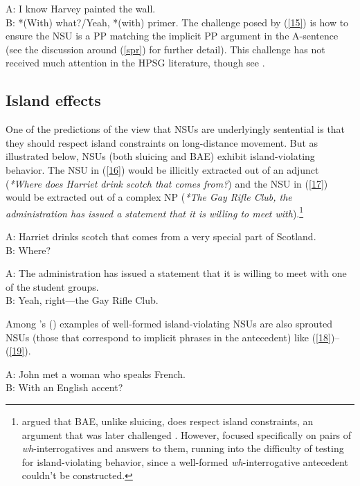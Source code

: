 {\ea A: I know Harvey painted the wall.\\B: *(With) what?/Yeah, *(with) primer.\label{15}\z
%
The challenge posed by (\ref{15}) is how to ensure
the NSU is a PP matching the implicit PP argument in 
the A-sentence (see the discussion
around (\ref{spr}) for further detail). This challenge has not received much attention in the HPSG literature, though see \citet{Kim2015}.



\subsection{Island effects}
\label{sec-island-effects}

One of the predictions of the view that NSUs are underlyingly sentential is that they should respect island constraints on long-distance movement. But as illustrated below, NSUs (both sluicing and BAE) exhibit island-violating behavior. The NSU  in (\ref{16}) would be illicitly extracted out of an adjunct (\textit{*Where does Harriet drink scotch that comes from?}) and the NSU  in (\ref{17}) would be extracted out of a complex NP (\textit{*The Gay Rifle Club, the administration has issued a statement that it is willing to meet with}).\footnote{\citet{Merchant2005a} argued that BAE, unlike sluicing, does respect island constraints, an argument that was later challenged \citep[see e.g,][]{CJ2005a, Griffiths2014}. However, \citet{Merchant2005-proc} focused specifically on pairs of \emph{wh}-interrogatives and answers to them, running into the difficulty of testing for island-violating behavior, since a well-formed \emph{wh}-interrogative antecedent couldn't be constructed.}

\ea A: Harriet drinks scotch that comes from a very special part of Scotland.\\B: Where? \citep[245]{CJ2005a} \label{16}\z

\ea A: The administration has issued a statement that it is willing to meet with one of the student groups.\\B: Yeah, right---the Gay Rifle Club. \citep[245]{CJ2005a} \label{17}\z

Among \citeauthor{CJ2005a}'s (\citeyear[245]{CJ2005a}) examples of well-formed island-violating NSUs are also sprouted NSUs (those that correspond to implicit phrases in the antecedent) like (\ref{18})--(\ref{19}).

\ea A: John met a woman who speaks French.\\B: With an English accent?\label{18}\z

}
